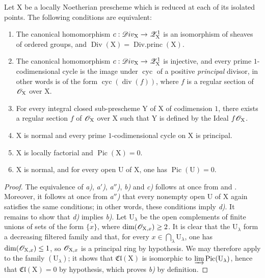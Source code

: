 \begin{corollary}[21.7.6]
\label{IV.21.7.6}
Let $\mathrm{X}$ be a locally Noetherian prescheme which is reduced at each of its isolated points.
The following conditions are equivalent:
\begin{enumerate}
  \item[\emph{a)}] The canonical homomorphism $c:\mathscr{D}iv_\mathrm{X}\to\mathscr{Z}_\mathrm{X}^1$ is an isomorphism of sheaves of ordered groups, and $\operatorname{Div}(\mathrm{X})=\operatorname{Div.princ}(\mathrm{X})$.
  \item[\emph{a$'$)}] The canonical homomorphism $c:\mathscr{D}iv_\mathrm{X}\to\mathscr{Z}_\mathrm{X}^1$ is injective, and every prime $1$-codimensional cycle is the image under $\operatorname{cyc}$ of a positive \emph{principal} divisor, in other words is of the form $\operatorname{cyc}(\operatorname{div}(f))$, where $f$ is a regular section of $\mathscr{O}_\mathrm{X}$ over $\mathrm{X}$.
  \item[\emph{a$''$)}] For every integral closed sub-prescheme $\mathrm{Y}$ of $\mathrm{X}$ of codimension $1$, there exists a regular section $f$ of $\mathscr{O}_\mathrm{X}$ over $\mathrm{X}$ such that $\mathrm{Y}$ is defined by the Ideal $f\mathscr{O}_\mathrm{X}$.
  \item[\emph{b)}] $\mathrm{X}$ is normal and every prime $1$-codimensional cycle on $\mathrm{X}$ is principal.
  \item[\emph{c)}] $\mathrm{X}$ is locally factorial and $\operatorname{Pic}(\mathrm{X})=0$.
  \item[\emph{d)}] $\mathrm{X}$ is normal, and for every open $\mathrm{U}$ of $\mathrm{X}$, one has $\operatorname{Pic}(\mathrm{U})=0$.
\end{enumerate}
\end{corollary}

\begin{proof}
The equivalence of \emph{a)}, \emph{a$'$)}, \emph{a$''$)}, \emph{b)} and \emph{c)} follows at once from  and .
Moreover, it follows at once from \emph{a$''$)} that every nonempty open $\mathrm{U}$ of $\mathrm{X}$ again satisfies the same conditions; in other words, these conditions imply \emph{d)}.
It remains to show that \emph{d)} implies \emph{b)}.
Let $\mathrm{U}_\lambda$ be the open complements of finite unions of sets of the form $\overline{\{x\}}$, where $\dim(\mathscr{O}_{\mathrm{X},x})\geq 2$.
It is clear that the $\mathrm{U}_\lambda$ form a decreasing filtered family and that, for every $x\in\bigcap_\lambda\mathrm{U}_\lambda$, one has $\dim(\mathscr{O}_{\mathrm{X},x})\leq 1$, so $\mathscr{O}_{\mathrm{X},x}$ is a principal ring by hypothesis.
We may therefore apply  to the family $(\mathrm{U}_\lambda)$; it shows that $\mathfrak{Cl}(\mathrm{X})$ is isomorphic to $\varinjlim\operatorname{Pic}(\mathrm{U}_\lambda)$, hence that $\mathfrak{Cl}(\mathrm{X})=0$ by hypothesis, which proves \emph{b)} by definition.
\end{proof}

